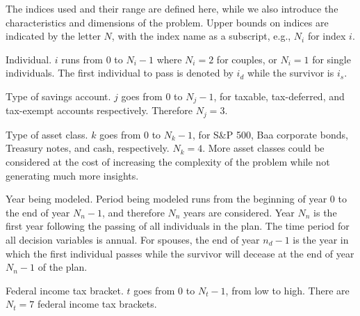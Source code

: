 \documentclass{report}[fleqn,12pt]
\begin{document}
The indices used and their range are defined here, while we also
introduce the characteristics and dimensions of the problem.
Upper bounds on indices are indicated by the letter $N$, with the
index name as a subscript, e.g., $N_i$ for index $i$.
\begin{description}[leftmargin=4em,style=multiline]
\item [$i$]
	Individual. $i$ runs from 0 to $N_i - 1$ where $N_i = 2$ for couples,
	or $N_i= 1$ for single individuals. The first individual to pass
		is denoted by $i_d$ while the survivor is $i_s$.
\item [$j$]
	Type of savings account. $j$ goes from 0 to $N_j - 1$, for taxable, tax-deferred,
	and tax-exempt accounts respectively. Therefore $N_j = 3$.
\item[$k$]
	Type of asset class. $k$ goes from 0 to $N_k -1 $, for S\&P 500,
	Baa corporate bonds, Treasury notes, and cash, respectively. $N_k = 4$.
	More asset classes could be considered at the cost of increasing
	the complexity of the problem while not generating much more insights.
\item [$n$]
	Year being modeled. Period being modeled runs from the beginning of year 0 to 
	the end of year $N_n-1$, and therefore $N_n$ years are considered.
	Year $N_n$ is the first year following the passing of all
	individuals in the plan. The time period for all decision variables is annual.
	For spouses, the end of year $n_d-1$ is the year in which the first individual passes while
	the survivor will decease at the end of year $N_n-1$ of the plan.
\item [$t$]
	Federal income tax bracket. $t$ goes from 0 to $N_t - 1$, from low to high.
	There are $N_t = 7$ federal income tax brackets.
\end{description}
\end{document}
